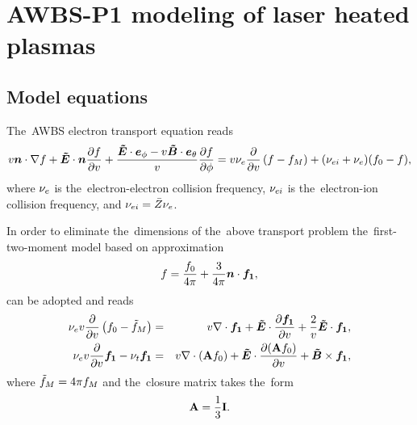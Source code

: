 \documentclass[preprint,12pt]{elsarticle}
\newcounter{bla}
\begin{document}
 \linenumbers

\tableofcontents

\section{AWBS-P1 modeling of laser heated plasmas}\label{sec:OOE_AWBSP1}
\subsection{Model equations}
The~AWBS electron transport equation reads
\begin{multline}
  v\boldsymbol{n}\cdot\nabla f + \boldsymbol{\tilde{E}}\cdot\boldsymbol{n} \frac{\partial{f}}{\partial{v}} 
  + \frac{\boldsymbol{\tilde{E}}\cdot\boldsymbol{e}_\phi 
  - v\boldsymbol{\tilde{B}}\cdot\boldsymbol{e}_\theta}{v}\frac{\partial{f}}{\partial{\phi}}
  =
  v \nu_{e} \frac{\partial{}}{\partial{v}}\left(f - f_M\right) 
  + (\nu_{ei} + \nu_{e}) (f_0 - f) ,
  \nonumber \label{eq:AWBS_model}
\end{multline}
where $\nu_{e}$ is the~electron-electron collision frequency, 
$\nu_{ei}$ is the~electron-ion collision frequency, and $\nu_{ei} = \bar{Z} \nu_{e}$.

In order to eliminate the~dimensions of the~above transport problem 
the~first-two-moment model based on approximation 
\begin{equation}
  f = \frac{f_0}{4\pi} + \frac{3}{4\pi}\boldsymbol{n}\cdot\boldsymbol{f_1} , 
  \nonumber \label{eq:OOE_P1approximation}
\end{equation}
can be adopted and reads
\begin{eqnarray}
  \nu_{e}v\frac{\partial{}}{\partial{v}}\left(f_0 - \tilde{f}_M \right) &=&
  v\nabla\cdot\boldsymbol{f_1} + \boldsymbol{\tilde{E}}\cdot
  \frac{\partial{\boldsymbol{f_1}}}{\partial{v}} + \frac{2}{v}\boldsymbol{\tilde{E}}\cdot\boldsymbol{f_1} , 
  \nonumber \label{eq:OOE_P1f0}\\
  \nu_{e}v\frac{\partial{}}{\partial{v}}\boldsymbol{f_1} - \nu_{t}\boldsymbol{f_1} &=& 
  v\nabla\cdot\left(\mathbf{A}f_0\right) + 
  \boldsymbol{\tilde{E}}\cdot\frac{\partial{\left(\mathbf{A}f_0\right)}}{\partial{v}} + \boldsymbol{\tilde{B}}\times\boldsymbol{f_1} ,
  \nonumber \label{eq:OOE_P1f1}
\end{eqnarray}
where $\tilde{f}_M = 4\pi f_M$ and the~closure matrix takes the~form
\begin{equation}
  \mathbf{A} = \frac{1}{3}\mathbf{I} .
  \nonumber \label{eq:OOE_P1closure}
\end{equation}
\end{document}
